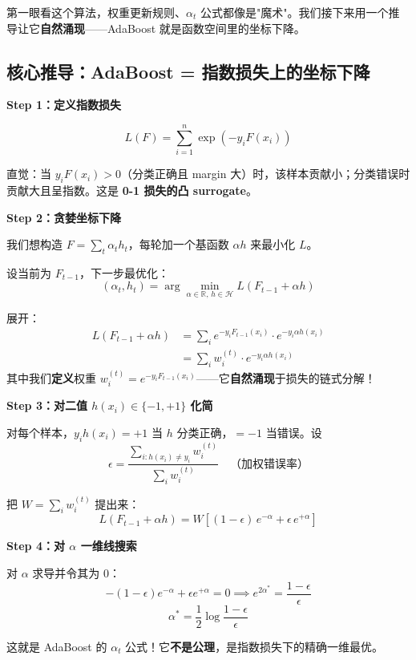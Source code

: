 \documentclass[12pt, a4paper]{ctexart}
\begin{document}
第一眼看这个算法，权重更新规则、$\alpha_t$ 公式都像是"魔术"。我们接下来用一个推导让它\textbf{自然涌现}——AdaBoost 就是函数空间里的坐标下降。

\subsection{核心推导：AdaBoost = 指数损失上的坐标下降}

\begin{blackboard}

\textbf{Step 1：定义指数损失}

\[
L(F) = \sum_{i=1}^{n} \exp(-y_i F(x_i))
\]

直觉：当 $y_i F(x_i) > 0$（分类正确且 margin 大）时，该样本贡献小；分类错误时贡献大且呈指数。这是 \textbf{0-1 损失的凸 surrogate}。

\textbf{Step 2：贪婪坐标下降}

我们想构造 $F = \sum_t \alpha_t h_t$，每轮加一个基函数 $\alpha h$ 来最小化 $L$。

设当前为 $F_{t-1}$，下一步最优化：
\[
(\alpha_t, h_t) = \arg\min_{\alpha \in \mathbb{R},\, h \in \mathcal{H}} L(F_{t-1} + \alpha h)
\]

展开：
\begin{align*}
L(F_{t-1} + \alpha h) &= \sum_i e^{-y_i F_{t-1}(x_i)} \cdot e^{-y_i \alpha h(x_i)} \\
&= \sum_i w_i^{(t)} \cdot e^{-y_i \alpha h(x_i)}
\end{align*}
其中我们\textbf{定义}权重 $w_i^{(t)} = e^{-y_i F_{t-1}(x_i)}$——它\textbf{自然涌现}于损失的链式分解！

\textbf{Step 3：对二值 $h(x_i) \in \{-1, +1\}$ 化简}

对每个样本，$y_i h(x_i) = +1$ 当 $h$ 分类正确，$= -1$ 当错误。设
\[
\epsilon = \frac{\sum_{i: h(x_i) \neq y_i} w_i^{(t)}}{\sum_i w_i^{(t)}} \quad \text{（加权错误率）}
\]

把 $W = \sum_i w_i^{(t)}$ 提出来：
\[
L(F_{t-1} + \alpha h) = W \left[(1-\epsilon)\, e^{-\alpha} + \epsilon\, e^{+\alpha}\right]
\]

\textbf{Step 4：对 $\alpha$ 一维线搜索}

对 $\alpha$ 求导并令其为 0：
\[
-(1-\epsilon)e^{-\alpha} + \epsilon e^{+\alpha} = 0 \implies e^{2\alpha^*} = \frac{1-\epsilon}{\epsilon}
\]
\[
\boxed{\alpha^* = \frac{1}{2}\log\frac{1-\epsilon}{\epsilon}}
\]

这就是 AdaBoost 的 $\alpha_t$ 公式！它\textbf{不是公理}，是指数损失下的精确一维最优。


\end{blackboard}
\end{document}
